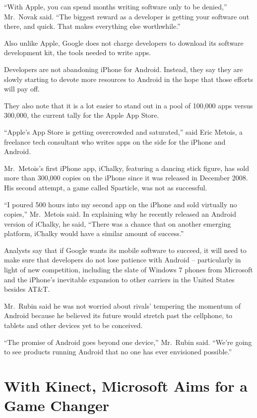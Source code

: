 ﻿\documentclass[12pt]{article}
\begin{document}
``With Apple, you can spend months writing software only to be denied,'' Mr.~Novak said. ``The
biggest reward as a developer is getting your software out there, and quick. That makes everything
else worthwhile.''

Also unlike Apple, Google does not charge developers to download its software development kit, the
tools needed to write apps.

Developers are not abandoning iPhone for Android. Instead, they say they are slowly starting to
devote more resources to Android in the hope that those efforts will pay off.

They also note that it is a lot easier to stand out in a pool of 100,000 apps versus 300,000, the
current tally for the Apple App Store.

``Apple's App Store is getting overcrowded and saturated,'' said Eric Metois, a freelance tech
consultant who writes apps on the side for the iPhone and Android.

Mr.~Metois's first iPhone app, iChalky, featuring a dancing stick figure, has sold more than 300,000
copies on the iPhone since it was released in December 2008. His second attempt, a game called
Sparticle, was not as successful.

``I poured 500 hours into my second app on the iPhone and sold virtually no copies,'' Mr.~Metois
said. In explaining why he recently released an Android version of iChalky, he said, ``There was a
chance that on another emerging platform, iChalky would have a similar amount of success.''

Analysts say that if Google wants its mobile software to succeed, it will need to make sure that
developers do not lose patience with Android -- particularly in light of new competition, including
the slate of Windows 7 phones from Microsoft and the iPhone's inevitable expansion to other carriers
in the United States besides AT\&T.

Mr.~Rubin said he was not worried about rivals' tempering the momentum of Android because he
believed its future would stretch past the cellphone, to tablets and other devices yet to be
conceived.

``The promise of Android goes beyond one device,'' Mr.~Rubin said. ``We're going to see products
running Android that no one has ever envisioned possible.''

\section{With Kinect, Microsoft Aims for a Game Changer}
\end{document}
